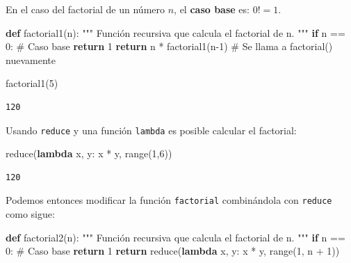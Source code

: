 \documentclass[
  spanish,
  letterpaper,
]{scrbook}
\newenvironment{Shaded}{\begin{snugshade}}{\end{snugshade}}
\newcommand{\BuiltInTok}[1]{\textcolor[rgb]{0.00,0.23,0.31}{#1}}
\newcommand{\CommentTok}[1]{\textcolor[rgb]{0.37,0.37,0.37}{#1}}
\newcommand{\ControlFlowTok}[1]{\textcolor[rgb]{0.00,0.23,0.31}{\textbf{#1}}}
\newcommand{\DecValTok}[1]{\textcolor[rgb]{0.68,0.00,0.00}{#1}}
\newcommand{\KeywordTok}[1]{\textcolor[rgb]{0.00,0.23,0.31}{\textbf{#1}}}
\newcommand{\NormalTok}[1]{\textcolor[rgb]{0.00,0.23,0.31}{#1}}
\newcommand{\OperatorTok}[1]{\textcolor[rgb]{0.37,0.37,0.37}{#1}}
\theoremstyle{definition}
\theoremstyle{remark}
\begin{document}
En el caso del factorial de un número \(n\), el \textbf{caso base} es:
\(0! = 1\).

\begin{Shaded}
\begin{Highlighting}[]
\KeywordTok{def}\NormalTok{ factorial1(n):}
    \CommentTok{"""}
\CommentTok{    Función recursiva que calcula el factorial de n.}
\CommentTok{    """}
    \ControlFlowTok{if}\NormalTok{ n }\OperatorTok{==} \DecValTok{0}\NormalTok{:    }\CommentTok{\# Caso base}
        \ControlFlowTok{return} \DecValTok{1}  
    \ControlFlowTok{return}\NormalTok{ n }\OperatorTok{*}\NormalTok{ factorial1(n}\OperatorTok{{-}}\DecValTok{1}\NormalTok{) }\CommentTok{\# Se llama a factorial() nuevamente}
\end{Highlighting}
\end{Shaded}

\begin{Shaded}
\begin{Highlighting}[]
\NormalTok{factorial1(}\DecValTok{5}\NormalTok{)}
\end{Highlighting}
\end{Shaded}

\begin{verbatim}
120
\end{verbatim}

Usando \texttt{reduce} y una función \texttt{lambda} es posible calcular
el factorial:

\begin{Shaded}
\begin{Highlighting}[]
\BuiltInTok{reduce}\NormalTok{(}\KeywordTok{lambda}\NormalTok{ x, y: x }\OperatorTok{*}\NormalTok{ y, }\BuiltInTok{range}\NormalTok{(}\DecValTok{1}\NormalTok{,}\DecValTok{6}\NormalTok{))}
\end{Highlighting}
\end{Shaded}

\begin{verbatim}
120
\end{verbatim}

Podemos entonces modificar la función \texttt{factorial} combinándola
con \texttt{reduce} como sigue:

\begin{Shaded}
\begin{Highlighting}[]
\KeywordTok{def}\NormalTok{ factorial2(n):}
    \CommentTok{"""}
\CommentTok{    Función recursiva que calcula el factorial de n.}
\CommentTok{    """}
    \ControlFlowTok{if}\NormalTok{ n }\OperatorTok{==} \DecValTok{0}\NormalTok{:    }\CommentTok{\# Caso base}
        \ControlFlowTok{return} \DecValTok{1}   
    \ControlFlowTok{return} \BuiltInTok{reduce}\NormalTok{(}\KeywordTok{lambda}\NormalTok{ x, y: x }\OperatorTok{*}\NormalTok{ y, }\BuiltInTok{range}\NormalTok{(}\DecValTok{1}\NormalTok{, n }\OperatorTok{+} \DecValTok{1}\NormalTok{))}
\end{Highlighting}
\end{Shaded}
\end{document}
